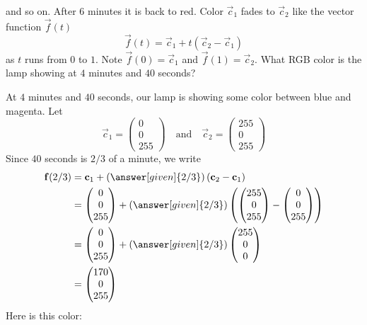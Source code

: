 \documentclass{ximera}
\begin{document}
\begin{example}
  and so on. After $6$ minutes it is back to red. Color $\vec{c}_1$
  fades to $\vec{c}_2$ like the vector function $\vec{f}(t)$
  \[
  \vec{f}(t) = \vec{c}_1+ t(\vec{c}_2 -\vec{c}_1)
  \]
  as $t$ runs from $0$ to $1$. Note $\vec{f}(0) = \vec{c}_1$ and
  $\vec{f}(1) = \vec{c}_2$.  What RGB color is the lamp showing at $4$
  minutes and $40$ seconds?
  \begin{explanation}
    At $4$ minutes and $40$ seconds, our lamp is showing some color
    between blue and magenta. Let
    \[
    \vec{c}_1 = \begin{pmatrix}0\\0\\255\end{pmatrix} \quad\text{and}\quad
      \vec{c}_2 = \begin{pmatrix}255\\0\\255\end{pmatrix}
    \]
    Since $40$ seconds is $2/3$ of a minute, we write
    \begin{align*}
      \vec{f}(2/3) &= \vec{c}_{1}+ \left(\answer[given]{2/3}\right)(\vec{c}_2 -\vec{c}_1) \\
      &= \begin{pmatrix}0\\0\\255\end{pmatrix}+ \left(\answer[given]{2/3}\right)\left(\begin{pmatrix}255\\0\\255\end{pmatrix}  -  \begin{pmatrix}0\\0\\255\end{pmatrix}\right) \\
      &=\begin{pmatrix}0\\0\\255\end{pmatrix}+ \left(\answer[given]{2/3}\right)\begin{pmatrix}255\\0\\0\end{pmatrix} \\
                &=\begin{pmatrix}170\\0\\255\end{pmatrix}
    \end{align*}
    Here is this color:
    \begin{center}
    \colorbox[RGB]{170,0, 255}{
      \parbox{1cm}{\rule{0pt}{1cm}}}
  \end{center}
  \end{explanation}
\end{example}
\end{document}
